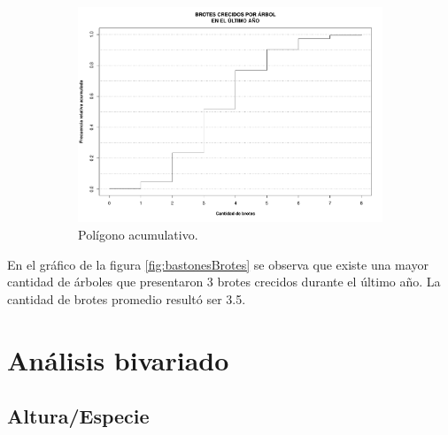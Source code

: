 \documentclass[11pt]{article}
\begin{document}
\begin{figure}[h!]
  \ContinuedFloat
  \begin{center}
    \begin{subfigure}[b]{0.9\linewidth}
      \includegraphics[width=\linewidth]{acumBrotes.pdf}
      \caption{Polígono acumulativo.}
      \label{fig:acumBrotes}
    \end{subfigure}
  \caption{}
  \end{center}  
\end{figure}

\newpage

\begin{justify}
  En el gráfico de la figura \ref{fig:bastonesBrotes} se observa que
  existe una mayor cantidad de árboles que presentaron 3 brotes crecidos
  durante el último año. La cantidad de brotes promedio resultó ser 3.5.
\end{justify}


\newpage
\section{Análisis bivariado}

\subsection{Altura/Especie}
\end{document}
